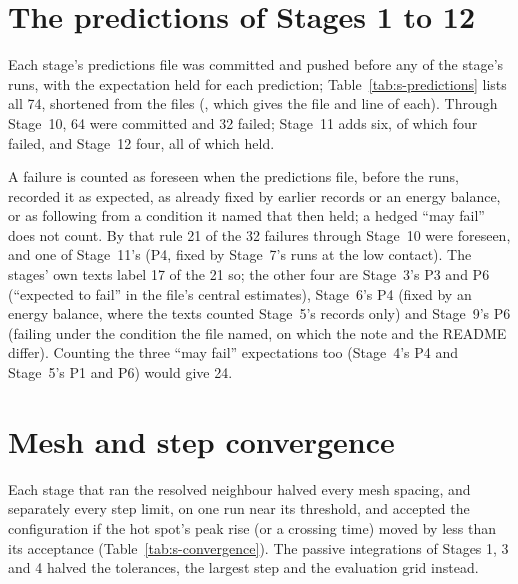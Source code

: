 \documentclass[preprint,12pt]{elsarticle}
\begin{document}
\section{The predictions of Stages 1 to 12}
\label{sec:s-predictions}

Each stage's predictions file was committed and pushed before any of the stage's runs, with the expectation held for each prediction; Table~\ref{tab:s-predictions} lists all 74, shortened from the files (, which gives the file and line of each). Through Stage~10, 64 were committed and 32 failed; Stage~11 adds six, of which four failed, and Stage~12 four, all of which held.

A failure is counted as foreseen when the predictions file, before the runs, recorded it as expected, as already fixed by earlier records or an energy balance, or as following from a condition it named that then held; a hedged ``may fail'' does not count. By that rule 21 of the 32 failures through Stage~10 were foreseen, and one of Stage~11's (P4, fixed by Stage~7's runs at the low contact). The stages' own texts label 17 of the 21 so; the other four are Stage~3's P3 and P6 (``expected to fail'' in the file's central estimates), Stage~6's P4 (fixed by an energy balance, where the texts counted Stage~5's records only) and Stage~9's P6 (failing under the condition the file named, on which the note and the README differ). Counting the three ``may fail'' expectations too (Stage~4's P4 and Stage~5's P1 and P6) would give 24.


\section{Mesh and step convergence}
\label{sec:s-convergence}

Each stage that ran the resolved neighbour halved every mesh spacing, and separately every step limit, on one run near its threshold, and accepted the configuration if the hot spot's peak rise (or a crossing time) moved by less than its acceptance (Table~\ref{tab:s-convergence}). The passive integrations of Stages 1, 3 and 4 halved the tolerances, the largest step and the evaluation grid instead.
\end{document}
